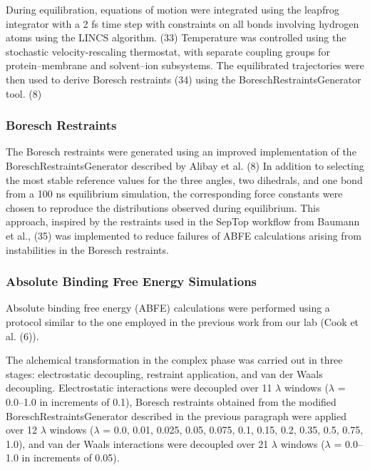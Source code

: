 During equilibration, equations of motion were integrated using the leapfrog integrator with a 2 fs time step with constraints on all bonds involving hydrogen atoms using the LINCS algorithm. (33) Temperature was controlled using the stochastic velocity-rescaling thermostat, with separate coupling groups for protein--membrane and solvent--ion subsystems. The equilibrated trajectories were then used to derive Boresch restraints (34) using the BoreschRestraintsGenerator tool. (8)

\subsubsection{Boresch Restraints}

The Boresch restraints were generated using an improved implementation of the BoreschRestraintsGenerator described by Alibay et al. (8) In addition to selecting the most stable reference values for the three angles, two dihedrals, and one bond from a 100 ns equilibrium simulation, the corresponding force constants were chosen to reproduce the distributions observed during equilibrium. This approach, inspired by the restraints used in the SepTop workflow from Baumann et al., (35) was implemented to reduce failures of ABFE calculations arising from instabilities in the Boresch restraints.

\subsubsection{Absolute Binding Free Energy Simulations}







Absolute binding free energy (ABFE) calculations were performed using a protocol similar to the one employed in the previous work from our lab (Cook et al. (6)).

The alchemical transformation in the complex phase was carried out in three stages: electrostatic decoupling, restraint application, and van der Waals decoupling. Electrostatic interactions were decoupled over 11 $\lambda$ windows ($\lambda$ = 0.0--1.0 in increments of 0.1), Boresch restraints obtained from the modified BoreschRestraintsGenerator described in the previous paragraph were applied over 12 $\lambda$ windows ($\lambda$ = 0.0, 0.01, 0.025, 0.05, 0.075, 0.1, 0.15, 0.2, 0.35, 0.5, 0.75, 1.0), and van der Waals interactions were decoupled over 21 $\lambda$ windows ($\lambda$ = 0.0--1.0 in increments of 0.05).

